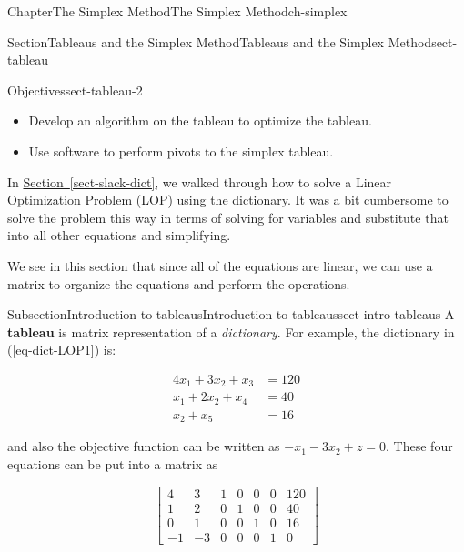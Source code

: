 \documentclass[oneside,10pt,]{book}
\newcommand{\xreffont}{\relax}
\newcommand{\terminology}[1]{\textbf{#1}}
\numberwithin{equation}{section}
\newcommand{\amp}{&}
\begin{document}
\begin{chapterptx}{Chapter}{The Simplex Method}{}{The Simplex Method}{}{}{ch-simplex}
\begin{sectionptx}{Section}{Tableaus and the Simplex Method}{}{Tableaus and the Simplex Method}{}{}{sect-tableau}
\begin{objectives}{Objectives}{sect-tableau-2}
\begin{itemize}[label=\textbullet]
\item{}Develop an algorithm on the tableau to optimize the tableau.%
\item{}Use software to perform pivots to the simplex tableau.%
\end{itemize}
\end{objectives}
\begin{introduction}{}%
In \hyperref[sect-slack-dict]{Section~{\xreffont\ref{sect-slack-dict}}}, we walked through how to solve a Linear Optimization Problem (LOP) using the dictionary. It was a bit cumbersome to solve the problem this way in terms of solving for variables and substitute that into all other equations and simplifying.%
\par
We see in this section that since all of the equations are linear, we can use a matrix to organize the equations and perform the operations.%
\end{introduction}%
%
%
\typeout{************************************************}
\typeout{************************************************}
%
\begin{subsectionptx}{Subsection}{Introduction to tableaus}{}{Introduction to tableaus}{}{}{sect-intro-tableaus}
A \terminology{tableau} is matrix representation of a \emph{dictionary}. For example, the dictionary in \hyperref[eq-dict-LOP1]{({\xreffont\ref{eq-dict-LOP1}})} is:%
\par
%
\begin{align*}
4x_1 + 3x_2 + x_3 \amp = 120\\
x_1 + 2x_2 + x_4 \amp = 40\\
x_2 + x_5 \amp = 16
\end{align*}
%
\par
and also the objective function can be written as \(-x_1 -3x_2 + z = 0\). These four equations can be put into a matrix as%
\par
%
\begin{equation}
\left[ \begin{array}{rr|rrrr|r} 4 \amp 3 \amp 1 \amp 0 \amp 0 \amp 0 \amp 120 \\ 1 \amp 2 \amp 0 \amp 1 \amp 0 \amp 0 \amp 40 \\ 0 \amp 1 \amp 0 \amp 0 \amp 1 \amp 0 \amp 16 \\ \hline -1 \amp -3 \amp 0 \amp 0 \amp 0 \amp 1 \amp 0 \end{array} \right]\label{eq-tableau-LOP1}
\end{equation}
%
\par

\end{subsectionptx}
\end{sectionptx}
\end{chapterptx}
\end{document}
